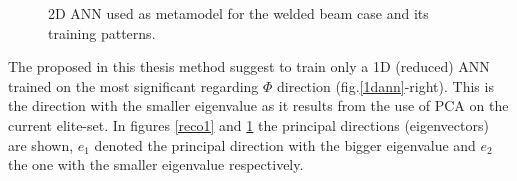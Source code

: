 \begin{figure}[h!]
\begin{minipage}[b]{1\linewidth}
 \centering
\end{minipage}
\caption{2D ANN used as metamodel for the welded beam case and its training patterns.} 
\label{2dann}
\end{figure}

The proposed in this thesis method suggest to train only a 1D (reduced) ANN trained on the most significant regarding $\Phi$ direction (fig.\ref{1dann}-right). This is the direction with the smaller eigenvalue as it results from the use of PCA on the current elite-set. In figures \ref{reco1} and \ref{2dann} the principal directions (eigenvectors) are shown, $e_1$ denoted the principal direction with the bigger eigenvalue and $e_2$ the one with the smaller eigenvalue respectively.   

